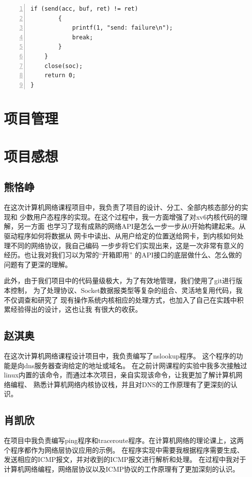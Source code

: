 \documentclass[a4paper,twoside]{ctexrep}
\begin{document}
\begin{spacing}{1.2}
\begin{lstlisting}[numbers=left,style=CppStyle,caption={TCP Echo Server},label={code:echoserver}]
		if (send(acc, buf, ret) != ret)
		{
			printf(1, "send: failure\n");
			break;
		}
	}
	close(soc);
	return 0;
}
\end{lstlisting}

\chapter{项目管理}

\chapter{项目感想}

\section{熊恪峥}

在这次计算机网络课程项目中，我负责了项目的设计、分工、全部内核态部分的实现和
少数用户态程序的实现。在这个过程中，我一方面增强了对xv6内核代码的理解，另一方面
也学习了现有成熟的网络API是怎么一步一步从0开始构建起来。从驱动程序如何将数据从
网卡中读出、从用户给定的位置送给网卡，到内核如何处理不同的网络协议，我自己编码
一步步将它们实现出来，这是一次非常有意义的经历。也让我对我们习以为常的“开箱即用”
的API接口的底层做什么、怎么做的问题有了更深的理解。

此外，由于我们项目中的代码量级极大，为了有效地管理，我们使用了git进行版本控制，
为了处理协议、Socket数据报类型等复杂的组合、灵活地复用代码，我不仅调查和研究了
现有操作系统内核相应的处理方式，也加入了自己在实践中积累经验得出的设计，这也让我
有很大的收获。

\section{赵淇奥}

在这次计算机网络课程设计项目中，我负责编写了nslookup程序。
这个程序的功能是向dns服务器查询给定的地址或域名。
在之前计网课程的实验中我多次接触过linux内置的该命令，而通过本次项目，亲自实现该命令，让我更加了解计算机网络编程、
熟悉计算机网络内核协议栈，并且对DNS的工作原理有了更深刻的认识。

\section{肖凯欣}

在项目中我负责编写ping程序和traceroute程序。在计算机网络的理论课上，这两个程序都作为网络层协议应用的示例。
在程序实现中需要我根据程序需要生成、发送相应的ICMP报文，并对收到的ICMP报文进行解析和处理。
在过程中我对于计算机网络编程，网络层协议以及ICMP协议的工作原理有了更加深刻的认识。


\end{spacing}
\end{document}

